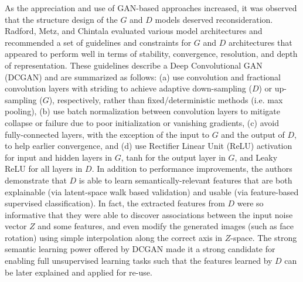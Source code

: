 \documentclass[11pt]{article}
\begin{document}
As the appreciation and use of GAN-based approaches increased, it was observed that the structure design of the $G$ and $D$ models deserved reconsideration.  Radford, Metz, and Chintala \cite{DBLP:journals/corr/RadfordMC15} evaluated various model architectures and recommended a set of guidelines and constraints for $G$ and $D$ architectures that appeared to perform well in terms of stability, convergence, resolution, and depth of representation.  These guidelines describe a Deep Convolutional GAN (DCGAN) and are summarized as follows: (a) use convolution and fractional convolution layers with striding to achieve adaptive down-sampling ($D$) or up-sampling ($G$), respectively, rather than fixed/deterministic methods (i.e. max pooling), (b) use batch normalization between convolution layers to mitigate collapse or failure due to poor initialization or vanishing gradients, (c) avoid fully-connected layers, with the exception of the input to $G$ and the output of $D$, to help earlier convergence, and (d) use Rectifier Linear Unit (ReLU) activation for input and hidden layers in $G$, tanh for the output layer in $G$, and Leaky ReLU for all layers in $D$.  In addition to performance improvements, the authors demonstrate that $D$ is able to learn semantically-relevant features that are both explainable (via latent-space walk based validation) and usable (via feature-based supervised classification).  In fact, the extracted features from $D$ were so informative that they were able to discover associations between the input noise vector $Z$ and some features, and even modify the generated images (such as face rotation) using simple interpolation along the correct axis in $Z$-space.  The strong semantic learning power offered by DCGAN made it a strong candidate for enabling full unsupervised learning tasks such that the features learned by $D$ can be later explained and applied for re-use.

\end{document}
